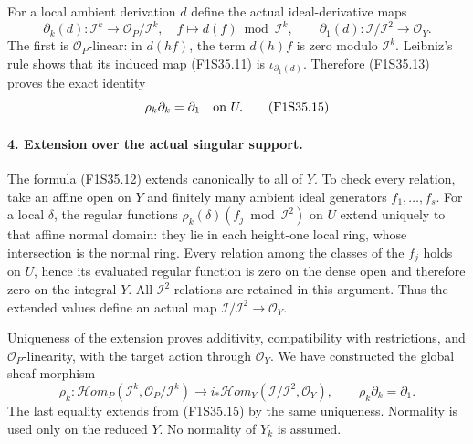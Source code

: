 For a local ambient derivation $d$ define the
actual ideal-derivative maps
\[
 \partial_k(d):\mathcal I^k\longrightarrow
                   \mathcal O_P/\mathcal I^k,
 \quad f\longmapsto d(f)\bmod\mathcal I^k,
 \qquad
 \partial_1(d):\mathcal I/\mathcal I^2
                           \longrightarrow\mathcal O_Y.
 \tag{F1S35.14}
\]
The first is $\mathcal O_P$-linear: in $d(hf)$,
the term $d(h)f$ is zero modulo $\mathcal I^k$.
Leibniz's rule shows that its induced map
(F1S35.11) is $\iota_{\partial_1(d)}$.
Therefore (F1S35.13) proves the exact identity
\[
                       \rho_k\partial_k=\partial_1
                         \quad\hbox{on }U.
 \tag{F1S35.15}
\]

\paragraph{4. Extension over the actual singular support.}
The formula (F1S35.12) extends canonically to
all of $Y$. To check every relation, take an
affine open on $Y$ and finitely many ambient
ideal generators $f_1,\ldots,f_s$.
For a local $\delta$, the regular functions
$\rho_k(\delta)(f_j\bmod\mathcal I^2)$ on
$U$ extend uniquely to that affine normal
domain: they lie in each height-one local
ring, whose intersection is the normal ring.
Every relation among the classes of the $f_j$
holds on $U$, hence its evaluated regular
function is zero on the dense open and
therefore zero on the integral $Y$.
All $\mathcal I^2$ relations are retained in
this argument. Thus the extended values
define an actual map
$\mathcal I/\mathcal I^2\to\mathcal O_Y$.

Uniqueness of the extension proves additivity,
compatibility with restrictions, and
$\mathcal O_P$-linearity, with the target
action through $\mathcal O_Y$.
We have constructed the global sheaf morphism
\[
 \rho_k:
 \mathcal Hom_P(\mathcal I^k,\mathcal O_P/\mathcal I^k)
       \longrightarrow
 i_*\mathcal Hom_Y(\mathcal I/\mathcal I^2,\mathcal O_Y),
 \qquad \rho_k\partial_k=\partial_1.
 \tag{F1S35.16}
\]
The last equality extends from (F1S35.15) by
the same uniqueness.
Normality is used only on the reduced $Y$.
No normality of $Y_k$ is assumed.

